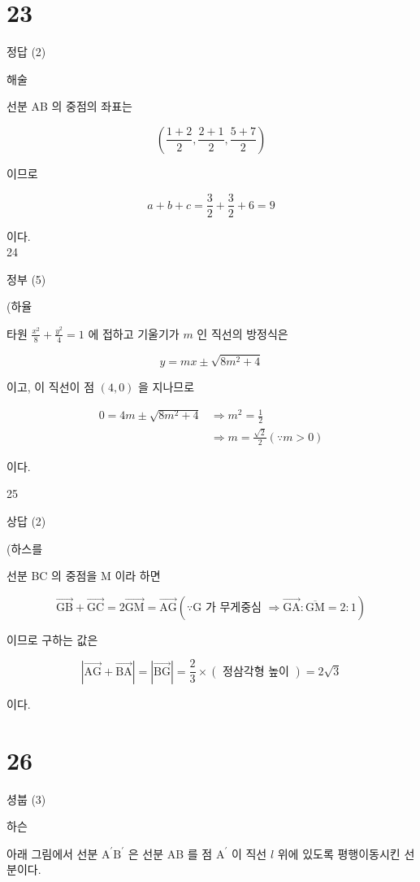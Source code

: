 \documentclass[10pt]{article}
\begin{document}
\section*{23}
정답 (2)

해술

선분 AB 의 중점의 좌표는

\[
\left(\frac{1+2}{2}, \frac{2+1}{2}, \frac{5+7}{2}\right)
\]

이므로

\[
a+b+c=\frac{3}{2}+\frac{3}{2}+6=9
\]

이다.\\
24

정부 (5)

(하율

타원 \(\frac{x^{2}}{8}+\frac{y^{2}}{4}=1\) 에 접하고 기울기가 \(m\) 인 직선의 방정식은

\[
y=m x \pm \sqrt{8 m^{2}+4}
\]

이고, 이 직선이 점 \((4,0)\) 을 지나므로

\[
\begin{aligned}
0=4 m \pm \sqrt{8 m^{2}+4} & \Rightarrow m^{2}=\frac{1}{2} \\
& \Rightarrow m=\frac{\sqrt{2}}{2}(\because m>0)
\end{aligned}
\]

이다.

25

상답 (2)

(하스를

선분 BC 의 중점을 M 이라 하면

\[
\overrightarrow{\mathrm{GB}}+\overrightarrow{\mathrm{GC}}=2 \overrightarrow{\mathrm{GM}}=\overrightarrow{\mathrm{AG}}(\because \mathrm{G} \text { 가 무게중심 } \Rightarrow \overrightarrow{\mathrm{GA}}: \overline{\mathrm{GM}}=2: 1)
\]

이므로 구하는 값은

\[
|\overrightarrow{\mathrm{AG}}+\overrightarrow{\mathrm{BA}}|=|\overrightarrow{\mathrm{BG}}|=\frac{2}{3} \times(\text { 정삼각형 높이 })=2 \sqrt{3}
\]

이다.

\section*{26}
셩붑 (3)

하슨

아래 그림에서 선분 \(\mathrm{A}^{\prime} \mathrm{B}^{\prime}\) 은 선분 AB 를 점 \(\mathrm{A}^{\prime}\) 이 직선 \(l\) 위에 있도록 평행이동시킨 선분이다.
\end{document}
